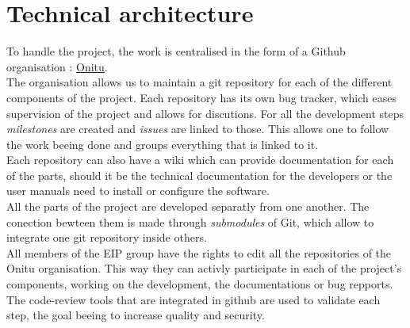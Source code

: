 \section{Technical architecture}
To handle the project, the work is centralised in the form of a Github organisation : \href{https://github.com/onitu/}{Onitu}.\\

The organisation allows us to maintain a git repository for each of the different components of the project. Each repository has its own bug tracker, which eases supervision of the project and allows for discutions.
For all the development steps \textit{milestones} are created and \textit{issues} are linked to those. This allows one to follow the work beeing done and groups everything that is linked to it.\\

Each repository can also have a wiki which can provide documentation for each of the parts, should it be the technical documentation for the developers or the user manuals need to install or configure the software.\\

All the parts of the project are developed separatly from one another. The conection bewteen them is made through \textit{submodules} of Git, which allow to integrate one git repository inside others.\\

All members of the EIP group have the rights to edit all the repositories of the Onitu organisation. This way they can activly participate in each of the project's components, working on the development, the documentations or bug repports.\\

The code-review tools that are integrated in github are used to validate each step, the goal beeing to increase quality and security.

